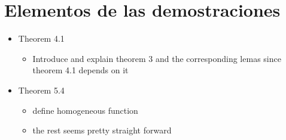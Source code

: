 \section{Elementos de las demostraciones}
\begin{itemize}
    \item Theorem 4.1
    \begin{itemize}
        \item Introduce and explain theorem 3 and the corresponding lemas since theorem 4.1 depends on it
    \end{itemize}
    \item Theorem 5.4
    \begin{itemize}
        \item define homogeneous function
        \item the rest seems pretty straight forward
    \end{itemize}
\end{itemize}

